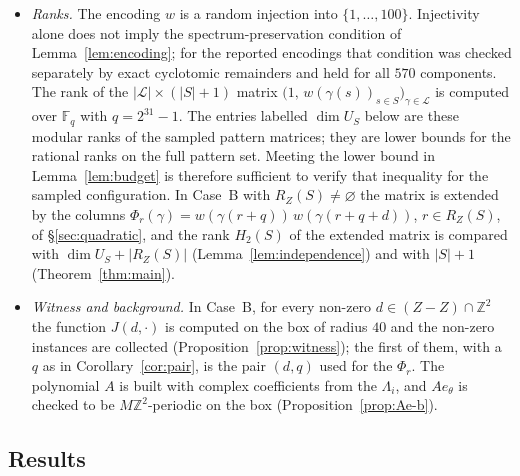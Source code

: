 \documentclass[11pt,reqno]{amsart}
\theoremstyle{plain}
\theoremstyle{definition}
\theoremstyle{remark}
\theoremstyle{plain}
\theoremstyle{remark}
\theoremstyle{definition}
\numberwithin{equation}{section}
\newcommand{\Z}{\mathbb{Z}}
\newcommand{\cL}{\mathcal{L}}
\begin{document}
\begin{itemize}
\item \emph{Ranks.}  The encoding $w$ is a random injection into
$\{1,\dots,100\}$.  Injectivity alone does not imply the spectrum-preservation
condition of Lemma~\ref{lem:encoding}; for the reported encodings that condition
was checked separately by exact cyclotomic remainders and held for all $570$
components.  The rank of the $|\cL|\times(|S|+1)$ matrix
$\bigl(1,\,w(\gamma(s))_{s\in S}\bigr)_{\gamma\in\cL}$ is computed over
$\mathbb F_q$ with $q=2^{31}-1$.  The entries labelled $\dim U_S$ below are
these modular ranks of the sampled pattern matrices; they are lower bounds
for the rational ranks on the full pattern set.  Meeting the lower bound in
Lemma~\ref{lem:budget} is therefore sufficient to verify that inequality for
the sampled configuration.  In Case~B with $R_Z(S)\ne\varnothing$ the matrix is
extended by the columns $\Phi_r(\gamma)=w(\gamma(r+q))\,w(\gamma(r+q+d))$,
$r\in R_Z(S)$, of \S\ref{sec:quadratic}, and the rank $H_2(S)$ of the
extended matrix is compared with $\dim U_S+|R_Z(S)|$
(Lemma~\ref{lem:independence}) and with $|S|+1$ (Theorem~\ref{thm:main}).

\item \emph{Witness and background.}  In Case~B, for every non-zero
$d\in(Z-Z)\cap\Z^2$ the function $J(d,\cdot)$ is computed on the box of
radius $40$ and the non-zero instances are collected
(Proposition~\ref{prop:witness}); the first of them, with a $q$ as in
Corollary~\ref{cor:pair}, is the pair $(d,q)$ used for the $\Phi_r$.  The
polynomial $A$ is built with complex coefficients from the $\Lambda_i$, and
$Ae_\theta$ is checked to be $M\Z^2$-periodic on the box
(Proposition~\ref{prop:Ae-b}).
\end{itemize}

\subsection{Results}\label{app:results}
\end{document}
